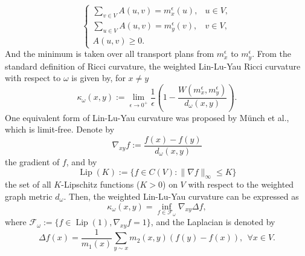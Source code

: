 \documentclass{article}
\begin{document}
\[
\begin{cases}
\sum_{v \in V} A(u,v) = m_x^\epsilon (u), & u \in V, \\
\sum_{u \in V} A(u,v) = m_y^\epsilon (v), & v \in V, \\
A(u,v) \geq 0.
\end{cases}
\]
And the minimum is taken over all transport plans from \( m_x^\epsilon \) to \( m_y^\epsilon \). From the standard definition of Ricci curvature, the weighted Lin-Lu-Yau Ricci curvature with respect to $\omega$ is given by, for $x\neq y$ 
\begin{equation}\label{lly}
    \kappa_{\omega}(x,y):=\lim_{\epsilon\rightarrow 0^+}\frac{1}{\epsilon}\left(1-\frac{W(m_x^\epsilon,m_y^\epsilon)}{d_\omega(x,y)}\right).
\end{equation}
One equivalent form of Lin-Lu-Yau curvature was proposed by Münch et al.\cite{MW}, which is limit-free. Denote by
      \[\nabla_{xy}f := \frac{f(x) - f(y)}{d_{\omega}(x, y)}\]
the gradient of $f$, and by
\[
\operatorname{Lip}(K) := \{ f \in C(V) : \|\nabla f\|_\infty \leq K \}
\]
the set of all $K$-Lipschitz functions ($K > 0$) on $V$ with respect to the weighted
graph metric $d_\omega$. Then, the weighted Lin-Lu-Yau curvature can be expressed as
\begin{equation*}
\kappa_{\omega}(x,y)=\inf_{f\in \mathcal{F}_{\omega} }\nabla_{xy}\Delta f,
\end{equation*}
where $\mathcal{F}_{\omega}:=\{f\in \operatorname{Lip}(1),\nabla_{xy}f=1\}$, and the Laplacian is denoted by 
\[\Delta f(x)=\frac{1}{m_1(x)}\sum_{y\sim x}m_2(x,y)(f(y)-f(x)),~~\forall x\in V.\]
\end{document}
